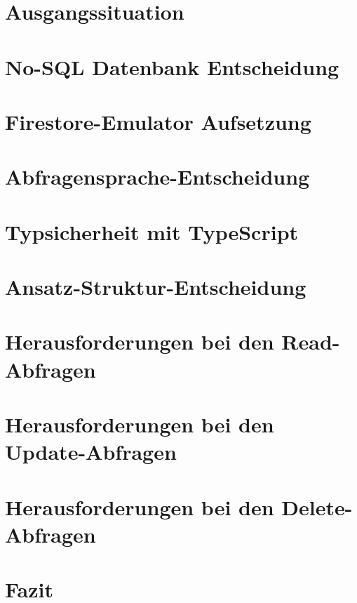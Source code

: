 \documentclass[12pt,a4paper%
              ,oneside     %
              ,titlepage
              ,DIV=13
              ,headinclude
              ,footinclude=false%
              ,cleardoublepage=empty%
              ,parskip=half,
              BCOR=0mm,
              ]{scrreprt}
\begin{document}
\selectlanguage{\thesisLanguage}

\setcounter{page}{1}

\THAtitlepage

\tableofcontents


\setcounter{page}{1}

\chapter{Ausgangssituation}
\chapter{No-SQL Datenbank Entscheidung}
\chapter{Firestore-Emulator Aufsetzung}
\chapter{Abfragensprache-Entscheidung}
\chapter{Typsicherheit mit TypeScript}
\chapter{Ansatz-Struktur-Entscheidung}
\chapter{Herausforderungen bei den Read-Abfragen}
\chapter{Herausforderungen bei den Update-Abfragen}
\chapter{Herausforderungen bei den Delete-Abfragen}
\chapter{Fazit}
\end{document}
